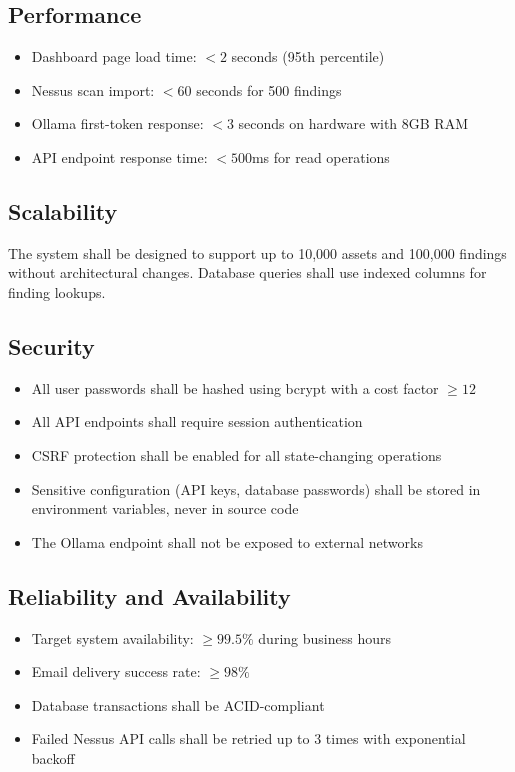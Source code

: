 \subsection{Performance}
\begin{itemize}
  \item Dashboard page load time: $< 2$ seconds (95th percentile)
  \item Nessus scan import: $< 60$ seconds for 500 findings
  \item Ollama first-token response: $< 3$ seconds on hardware with 8GB RAM
  \item API endpoint response time: $< 500$ms for read operations
\end{itemize}

\subsection{Scalability}
The system shall be designed to support up to 10,000 assets and 100,000 findings without architectural changes. Database queries shall use indexed columns for finding lookups.

\subsection{Security}
\begin{itemize}
  \item All user passwords shall be hashed using bcrypt with a cost factor $\geq 12$
  \item All API endpoints shall require session authentication
  \item CSRF protection shall be enabled for all state-changing operations
  \item Sensitive configuration (API keys, database passwords) shall be stored in environment variables, never in source code
  \item The Ollama endpoint shall not be exposed to external networks
\end{itemize}

\subsection{Reliability and Availability}
\begin{itemize}
  \item Target system availability: $\geq 99.5\%$ during business hours
  \item Email delivery success rate: $\geq 98\%$
  \item Database transactions shall be ACID-compliant
  \item Failed Nessus API calls shall be retried up to 3 times with exponential backoff
\end{itemize}

